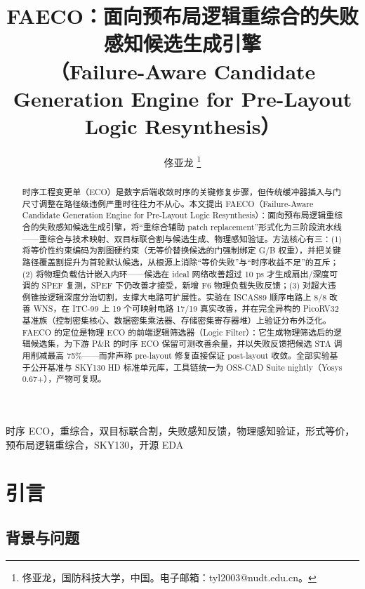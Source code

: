 \documentclass[journal]{IEEEtran}
\title{FAECO：面向预布局逻辑重综合的失败感知候选生成引擎\\
（Failure-Aware Candidate Generation Engine for Pre-Layout Logic Resynthesis）}
\author{佟亚龙%
\thanks{佟亚龙，国防科技大学，中国。电子邮箱：tyl2003@nudt.edu.cn。}}
\begin{document}
\maketitle

\begin{abstract}
时序工程变更单（ECO）是数字后端收敛时序的关键修复步骤，但传统缓冲器插入与门尺寸调整在路径级违例严重时往往力不从心。本文提出 FAECO（Failure-Aware Candidate Generation Engine for Pre-Layout Logic Resynthesis）：面向预布局逻辑重综合的失败感知候选生成引擎，将“重综合辅助 patch replacement”形式化为三阶段流水线——重综合与技术映射、双目标联合割与候选生成、物理感知验证。方法核心有三：(1) 将等价性约束编码为割图硬约束（无等价替换候选的门强制绑定 G/B 权重），并把关键路径覆盖割提升为首轮默认候选，从根源上消除“等价失败”与“时序收益不足”的互斥；(2) 将物理负载估计嵌入内环——候选在 ideal 网络改善超过 10 ps 才生成扇出/深度可调的 SPEF 复测，SPEF 下仍改善才接受，新增 F6 物理负载失败反馈；(3) 对超大违例锥按逻辑深度分治切割，支撑大电路可扩展性。实验在 ISCAS89 顺序电路上 8/8 改善 WNS，在 ITC-99 上 19 个可映射电路 17/19 真实改善，并在完全异构的 PicoRV32 基准族（控制密集核心、数据密集乘法器、存储密集寄存器堆）上验证分布外泛化。FAECO 的定位是物理 ECO 的前端逻辑筛选器（Logic Filter）：它生成物理筛选后的逻辑候选集，为下游 P\&R 的时序 ECO 保留可测改善余量，并以失败反馈把候选 STA 调用削减最高 75\%——而非声称 pre-layout 修复直接保证 post-layout 收敛。全部实验基于公开基准与 SKY130 HD 标准单元库，工具链统一为 OSS-CAD Suite nightly（Yosys 0.67+），产物可复现。
\end{abstract}

\begin{IEEEkeywords}
时序 ECO，重综合，双目标联合割，失败感知反馈，物理感知验证，形式等价，预布局逻辑重综合，SKY130，开源 EDA
\end{IEEEkeywords}

\section{引言}

\subsection{背景与问题}
\end{document}
